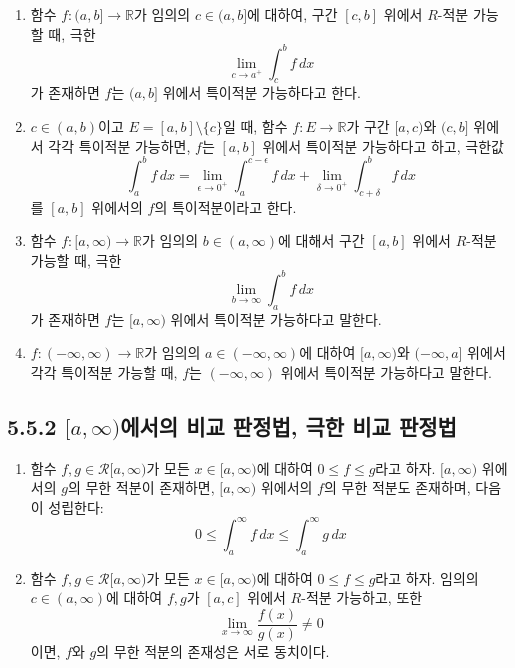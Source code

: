 \documentclass{article}
\begin{document}
\begin{enumerate}
    \item 함수 \( f: (a, b] \to \mathbb{R} \)가 임의의 \( c \in (a, b] \)에 대하여, 구간 \( [c, b] \) 위에서 \( {R} \)-적분 가능할 때, 극한 
    \[
    \lim_{c \to a^+} \int_c^b f \, dx
    \]
    가 존재하면 \( f \)는 \( (a, b] \) 위에서 특이적분 가능하다고 한다.
    
    \item \( c \in (a, b) \)이고 \( E = [a, b] \setminus \{c\} \)일 때, 함수 \( f: E \to \mathbb{R} \)가 구간 \( [a, c) \)와 \( (c, b] \) 위에서 각각 특이적분 가능하면, 
    \( f \)는 \( [a, b] \) 위에서 특이적분 가능하다고 하고, 극한값 
    \[
    \int_a^b f \, dx = \lim_{\epsilon \to 0^+} \int_a^{c - \epsilon} f \, dx + \lim_{\delta \to 0^+} \int_{c + \delta}^b f \, dx
    \]
    를 \( [a, b] \) 위에서의 \( f \)의 특이적분이라고 한다.
    
    \item 함수 \( f: [a, \infty) \to \mathbb{R} \)가 임의의 \( b \in (a, \infty) \)에 대해서 구간 \( [a, b] \) 위에서 \({R} \)-적분 가능할 때, 극한
    \[
    \lim_{b \to \infty} \int_a^b f \, dx
    \]
    가 존재하면 \( f \)는 \( [a, \infty) \) 위에서 특이적분 가능하다고 말한다.
    
    \item \( f: (-\infty, \infty) \to \mathbb{R} \)가 임의의 \( a \in (-\infty, \infty) \)에 대하여 \( [a, \infty) \)와 \( (-\infty, a] \) 위에서 각각 특이적분 가능할 때, \( f \)는 \( (-\infty, \infty) \) 위에서 특이적분 가능하다고 말한다.
\end{enumerate}

\subsection*{5.5.2 \([a, \infty)\)에서의 비교 판정법, 극한 비교 판정법}

\begin{enumerate}
    \item 함수 \( f, g \in \mathcal{R}[a, \infty) \)가 모든 \( x \in [a, \infty) \)에 대하여 \( 0 \leq f \leq g \)라고 하자. \( [a, \infty) \) 위에서의 \( g \)의 무한 적분이 존재하면, \( [a, \infty) \) 위에서의 \( f \)의 무한 적분도 존재하며, 다음이 성립한다:
    \[
    0 \leq \int_a^\infty f \, dx \leq \int_a^\infty g \, dx
    \]
    
    \item 함수 \( f, g \in \mathcal{R}[a, \infty) \)가 모든 \( x \in [a, \infty) \)에 대하여 \( 0 \leq f \leq g \)라고 하자. 임의의 \( c \in (a, \infty) \)에 대하여 \( f, g \)가 \( [a, c] \) 위에서 \({R} \)-적분 가능하고, 또한
    \[
    \lim_{x \to \infty} \frac{f(x)}{g(x)} \neq 0
    \]
    이면, \( f \)와 \( g \)의 무한 적분의 존재성은 서로 동치이다.
\end{enumerate}
\end{document}
